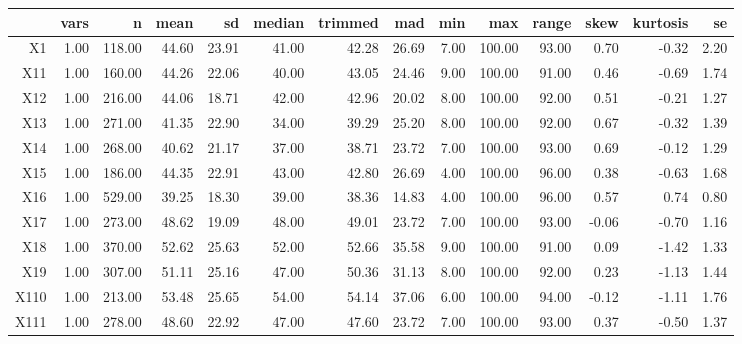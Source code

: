 \begin{tabular}{rrrrrrrrrrrrrr}
  \hline
 & vars & n & mean & sd & median & trimmed & mad & min & max & range & skew & kurtosis & se \\ 
  \hline
X1 & 1.00 & 118.00 & 44.60 & 23.91 & 41.00 & 42.28 & 26.69 & 7.00 & 100.00 & 93.00 & 0.70 & -0.32 & 2.20 \\ 
  X11 & 1.00 & 160.00 & 44.26 & 22.06 & 40.00 & 43.05 & 24.46 & 9.00 & 100.00 & 91.00 & 0.46 & -0.69 & 1.74 \\ 
  X12 & 1.00 & 216.00 & 44.06 & 18.71 & 42.00 & 42.96 & 20.02 & 8.00 & 100.00 & 92.00 & 0.51 & -0.21 & 1.27 \\ 
  X13 & 1.00 & 271.00 & 41.35 & 22.90 & 34.00 & 39.29 & 25.20 & 8.00 & 100.00 & 92.00 & 0.67 & -0.32 & 1.39 \\ 
  X14 & 1.00 & 268.00 & 40.62 & 21.17 & 37.00 & 38.71 & 23.72 & 7.00 & 100.00 & 93.00 & 0.69 & -0.12 & 1.29 \\ 
  X15 & 1.00 & 186.00 & 44.35 & 22.91 & 43.00 & 42.80 & 26.69 & 4.00 & 100.00 & 96.00 & 0.38 & -0.63 & 1.68 \\ 
  X16 & 1.00 & 529.00 & 39.25 & 18.30 & 39.00 & 38.36 & 14.83 & 4.00 & 100.00 & 96.00 & 0.57 & 0.74 & 0.80 \\ 
  X17 & 1.00 & 273.00 & 48.62 & 19.09 & 48.00 & 49.01 & 23.72 & 7.00 & 100.00 & 93.00 & -0.06 & -0.70 & 1.16 \\ 
  X18 & 1.00 & 370.00 & 52.62 & 25.63 & 52.00 & 52.66 & 35.58 & 9.00 & 100.00 & 91.00 & 0.09 & -1.42 & 1.33 \\ 
  X19 & 1.00 & 307.00 & 51.11 & 25.16 & 47.00 & 50.36 & 31.13 & 8.00 & 100.00 & 92.00 & 0.23 & -1.13 & 1.44 \\ 
  X110 & 1.00 & 213.00 & 53.48 & 25.65 & 54.00 & 54.14 & 37.06 & 6.00 & 100.00 & 94.00 & -0.12 & -1.11 & 1.76 \\ 
  X111 & 1.00 & 278.00 & 48.60 & 22.92 & 47.00 & 47.60 & 23.72 & 7.00 & 100.00 & 93.00 & 0.37 & -0.50 & 1.37 \\ 
   \hline
\end{tabular}

